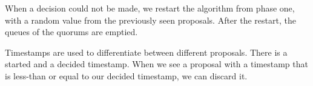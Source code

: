 \documentclass[times, 12pt,twocolumn]{article}
\begin{document}
When a decision could not be made, we restart the algorithm from phase one, with 
a random value from the previously seen proposals. After the restart, the 
queues of the quorums are emptied.

Timestamps are used to differentiate between different proposals. There is a started 
and a decided timestamp. When we see a proposal with a timestamp that is less-than 
or equal to our decided timestamp, we can discard it.









 
\end{document}
